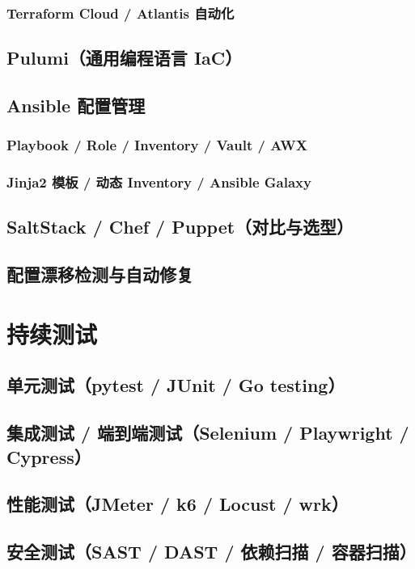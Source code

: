\documentclass[12pt,UTF8]{ctexbook}
\begin{document}
    \subsection{Terraform Cloud / Atlantis 自动化}

  \section{Pulumi（通用编程语言 IaC）}
  \section{Ansible 配置管理}
    \subsection{Playbook / Role / Inventory / Vault / AWX}
    \subsection{Jinja2 模板 / 动态 Inventory / Ansible Galaxy}

  \section{SaltStack / Chef / Puppet（对比与选型）}
  \section{配置漂移检测与自动修复}

\chapter{持续测试}
\label{chap:continuous-testing}

  \section{单元测试（pytest / JUnit / Go testing）}
  \section{集成测试 / 端到端测试（Selenium / Playwright / Cypress）}
  \section{性能测试（JMeter / k6 / Locust / wrk）}
  \section{安全测试（SAST / DAST / 依赖扫描 / 容器扫描）}
\end{document}
